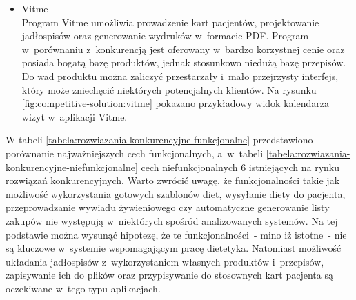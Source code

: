 \begin{itemize}

    \item Vitme\\
        Program Vitme\cite{url:vitme} umożliwia prowadzenie kart pacjentów, projektowanie jadłospisów oraz generowanie wydruków w~formacie PDF.
        Program w~porównaniu z~konkurencją jest oferowany w~bardzo korzystnej cenie oraz posiada bogatą bazę produktów, jednak stosunkowo niedużą bazę przepisów.
        Do wad produktu można zaliczyć przestarzały i~mało przejrzysty interfejs, który może zniechęcić niektórych potencjalnych klientów.
        Na rysunku \ref{fig:competitive-solution:vitme} pokazano przykładowy widok kalendarza wizyt w~aplikacji Vitme.


\end{itemize}

W tabeli \ref{tabela:rozwiazania-konkurencyjne-funkcjonalne} przedstawiono porównanie najważniejszych cech funkcjonalnych,
a~w~tabeli \ref{tabela:rozwiazania-konkurencyjne-niefunkcjonalne} cech niefunkcjonalnych
6 istniejących na rynku rozwiązań konkurencyjnych\cite{url:porownanie-programow-dietetycznych}.
Warto zwrócić uwagę, że funkcjonalności takie jak możliwość wykorzystania gotowych szablonów diet, wysyłanie diety do pacjenta,
przeprowadzanie wywiadu żywieniowego czy automatyczne generowanie listy zakupów nie występują w~niektórych spośród analizowanych systemów.
Na tej podstawie można wysunąć hipotezę, że te funkcjonalności~- mino iż istotne~- nie są kluczowe w~systemie wspomagającym pracę dietetyka.
Natomiast możliwość układania jadłospisów z~wykorzystaniem własnych produktów i~przepisów,
zapisywanie ich do plików oraz przypisywanie do stosownych kart pacjenta są oczekiwane w~tego typu aplikacjach.

